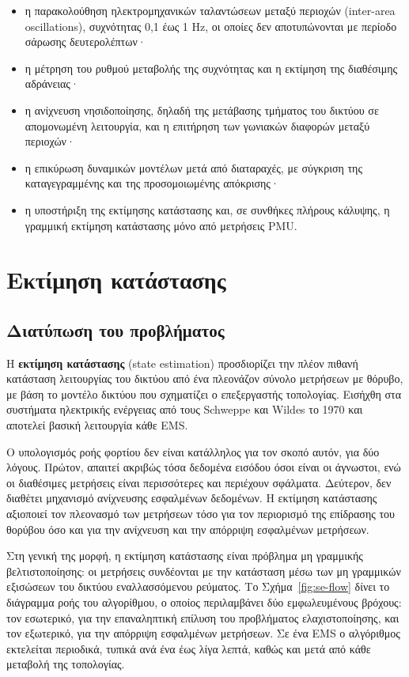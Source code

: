 \begin{itemize}
\item η παρακολούθηση ηλεκτρομηχανικών ταλαντώσεων μεταξύ περιοχών (inter-area
      oscillations), συχνότητας 0,1 έως 1 Hz, οι οποίες δεν αποτυπώνονται με περίοδο
      σάρωσης δευτερολέπτων·
\item η μέτρηση του ρυθμού μεταβολής της συχνότητας και η εκτίμηση της διαθέσιμης
      αδράνειας·
\item η ανίχνευση νησιδοποίησης, δηλαδή της μετάβασης τμήματος του δικτύου σε απομονωμένη
      λειτουργία, και η επιτήρηση των γωνιακών διαφορών μεταξύ περιοχών·
\item η επικύρωση δυναμικών μοντέλων μετά από διαταραχές, με σύγκριση της καταγεγραμμένης
      και της προσομοιωμένης απόκρισης·
\item η υποστήριξη της εκτίμησης κατάστασης και, σε συνθήκες πλήρους κάλυψης, η
      γραμμική εκτίμηση κατάστασης μόνο από μετρήσεις PMU.
\end{itemize}

\section{Εκτίμηση κατάστασης}

\subsection{Διατύπωση του προβλήματος}

Η \textbf{εκτίμηση κατάστασης} (state estimation) προσδιορίζει την πλέον πιθανή κατάσταση
λειτουργίας του δικτύου από ένα πλεονάζον σύνολο μετρήσεων με θόρυβο, με βάση το μοντέλο
δικτύου που σχηματίζει ο επεξεργαστής τοπολογίας. Εισήχθη στα συστήματα ηλεκτρικής ενέργειας
από τους Schweppe και Wildes το 1970 και αποτελεί βασική λειτουργία κάθε EMS.

Ο υπολογισμός ροής φορτίου δεν είναι κατάλληλος για τον σκοπό αυτόν, για δύο λόγους.
Πρώτον, απαιτεί ακριβώς τόσα δεδομένα εισόδου όσοι είναι οι άγνωστοι, ενώ οι διαθέσιμες
μετρήσεις είναι περισσότερες και περιέχουν σφάλματα. Δεύτερον, δεν διαθέτει μηχανισμό
ανίχνευσης εσφαλμένων δεδομένων. Η εκτίμηση κατάστασης αξιοποιεί τον πλεονασμό των
μετρήσεων τόσο για τον περιορισμό της επίδρασης του θορύβου όσο και για την ανίχνευση και
την απόρριψη εσφαλμένων μετρήσεων.

Στη γενική της μορφή, η εκτίμηση κατάστασης είναι πρόβλημα μη γραμμικής βελτιστοποίησης:
οι μετρήσεις συνδέονται με την κατάσταση μέσω των μη γραμμικών εξισώσεων του δικτύου
εναλλασσόμενου ρεύματος. Το Σχήμα~\ref{fig:se-flow} δίνει το διάγραμμα ροής του αλγορίθμου,
ο οποίος περιλαμβάνει δύο εμφωλευμένους βρόχους: τον εσωτερικό, για την επαναληπτική επίλυση
του προβλήματος ελαχιστοποίησης, και τον εξωτερικό, για την απόρριψη εσφαλμένων μετρήσεων.
Σε ένα EMS ο αλγόριθμος εκτελείται περιοδικά, τυπικά ανά ένα έως λίγα λεπτά, καθώς και μετά
από κάθε μεταβολή της τοπολογίας.

